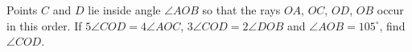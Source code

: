 Points $C$ and $D$ lie inside angle $\angle AOB$ so that the rays $OA$, $OC$, $OD$, $OB$ occur in this order. If $5\angle COD=4\angle AOC$, $3\angle COD=2\angle DOB$ and $\angle AOB=105^\circ$, find $\angle COD$.
